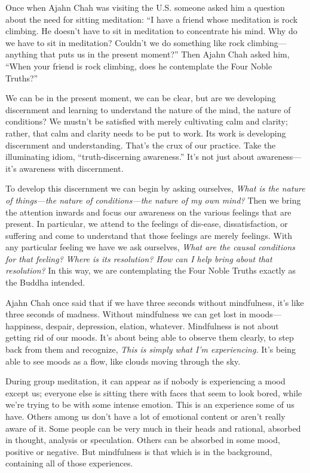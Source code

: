 Once when Ajahn Chah was visiting the U.S. someone asked him a question 
about the need for sitting meditation: ``I have a friend whose 
meditation is rock climbing. He doesn't have to sit in meditation to 
concentrate his mind. Why do we have to sit in meditation? Couldn't we 
do something like rock climbing---anything that puts us in the present 
moment?'' Then Ajahn Chah asked him, ``When your friend is rock 
climbing, does he contemplate the Four Noble Truths?''

We can be in the present moment, we can be clear, but are we developing 
discernment and learning to understand the nature of the mind, the 
nature of conditions? We mustn't be satisfied with merely cultivating 
calm and clarity; rather, that calm and clarity needs to be put to 
work. Its work is developing discernment and understanding. That's the 
crux of our practice. Take the illuminating idiom, ``truth-discerning 
awareness.'' It's not just about awareness---it's awareness with 
discernment.

To develop this discernment we can begin by asking ourselves, 
\emph{What is the nature of things---the nature of conditions---the 
nature of my own mind?} Then we bring the attention inwards and focus 
our awareness on the various feelings that are present. In particular, 
we attend to the feelings of dis-ease, dissatisfaction, or suffering 
and come to understand that those feelings are merely feelings. With 
any particular feeling we have we ask ourselves, \emph{What are the 
causal conditions for that feeling? Where is its resolution? How can I 
help bring about that resolution?} In this way, we are contemplating 
the Four Noble Truths exactly as the Buddha intended.


Ajahn Chah once said that if we have three seconds without mindfulness, 
it's like three seconds of madness. Without mindfulness we can get lost 
in moods---happiness, despair, depression, elation, whatever. 
Mindfulness is not about getting rid of our moods. It's about being 
able to observe them clearly, to step back from them and recognize, 
\emph{This is simply what I'm experiencing.} It's being able to see 
moods as a flow, like clouds moving through the sky.

During group meditation, it can appear as if nobody is experiencing a 
mood except us; everyone else is sitting there with faces that seem to 
look bored, while we're trying to be with some intense emotion. This is 
an experience some of us have. Others among us don't have a lot of 
emotional content or aren't really aware of it. Some people can be very 
much in their heads and rational, absorbed in thought, analysis or 
speculation. Others can be absorbed in some mood, positive or negative. 
But mindfulness is that which is in the background, containing all of 
those experiences.


